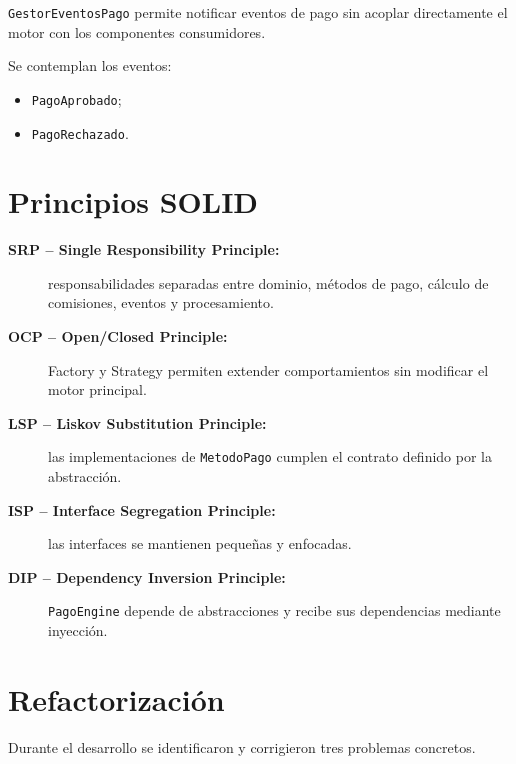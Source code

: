 \documentclass[11pt,a4paper]{article}
\begin{document}
\texttt{GestorEventosPago} permite notificar eventos de pago
sin acoplar directamente el motor con los componentes
consumidores.

Se contemplan los eventos:

\begin{itemize}
    \item \texttt{PagoAprobado};
    \item \texttt{PagoRechazado}.
\end{itemize}

\section{Principios SOLID}

\begin{description}
    \item[\textbf{SRP -- Single Responsibility Principle:}]
    responsabilidades separadas entre dominio, métodos de
    pago, cálculo de comisiones, eventos y procesamiento.

    \item[\textbf{OCP -- Open/Closed Principle:}]
    Factory y Strategy permiten extender comportamientos sin
    modificar el motor principal.

    \item[\textbf{LSP -- Liskov Substitution Principle:}]
    las implementaciones de \texttt{MetodoPago} cumplen el
    contrato definido por la abstracción.

    \item[\textbf{ISP -- Interface Segregation Principle:}]
    las interfaces se mantienen pequeñas y enfocadas.

    \item[\textbf{DIP -- Dependency Inversion Principle:}]
    \texttt{PagoEngine} depende de abstracciones y recibe
    sus dependencias mediante inyección.
\end{description}

\section{Refactorización}

Durante el desarrollo se identificaron y corrigieron tres
problemas concretos.
\end{document}
